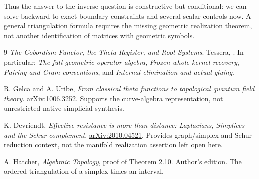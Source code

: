\documentclass[11pt]{article}
\theoremstyle{definition}
\begin{document}
Thus the answer to the inverse question is constructive but conditional:
we can solve backward to exact boundary constraints and several scalar
controls now. A general triangulation formula requires the missing
geometric realization theorem, not another identification of matrices
with geometric symbols.

\clearpage
\begin{thebibliography}{9}
\emph{The Cobordism Functor, the Theta Register, and Root Systems}.
Tessera, .
In particular: \emph{The full geometric operator algebra},
\emph{Frozen whole-kernel recovery}, \emph{Pairing and Gram conventions},
and \emph{Internal elimination and actual gluing}.

R. Gelca and A. Uribe,
\emph{From classical theta functions to topological quantum field theory}.
\href{https://arxiv.org/abs/1006.3252}{arXiv:1006.3252}.
Supports the curve-algebra representation, not unrestricted native
simplicial synthesis.

K. Devriendt,
\emph{Effective resistance is more than distance: Laplacians, Simplices
and the Schur complement}.
\href{https://arxiv.org/abs/2010.04521}{arXiv:2010.04521}.
Provides graph/simplex and Schur-reduction context, not the manifold
realization assertion left open here.

A. Hatcher, \emph{Algebraic Topology}, proof of Theorem 2.10.
\href{https://pi.math.cornell.edu/~hatcher/AT/AT.pdf}{Author's edition}.
The ordered triangulation of a simplex times an interval.
\end{thebibliography}
\end{document}
